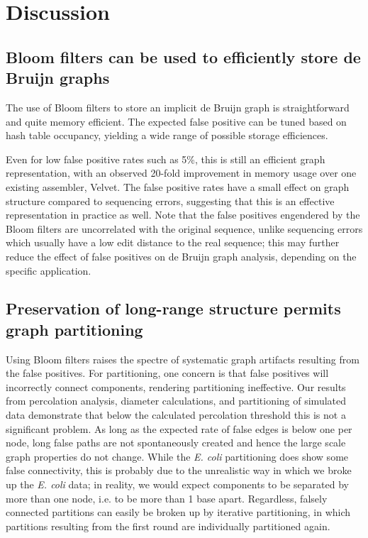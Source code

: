 \documentclass[12pt]{article} \usepackage{simplemargins}
\begin{document}
\section{Discussion}

\subsection{Bloom filters can be used to efficiently store de Bruijn graphs}


The use of Bloom filters to store an implicit de Bruijn graph is
straightforward and quite memory efficient.  The expected false
positive can be tuned based on hash table occupancy, yielding a wide
range of possible storage efficiences.

Even for low false positive rates such as 5\%, this is still an 
efficient graph representation, with an observed 20-fold improvement
in memory usage over one existing assembler, Velvet.  The false
positive rates have a small effect on graph structure compared to
sequencing errors, suggesting that this is an effective representation
in practice as well.  Note that the false positives engendered by the
Bloom filters are uncorrelated with the original sequence, unlike
sequencing errors which usually have a low edit distance to the
real sequence; this may further reduce the effect of false positives
on de Bruijn graph analysis, depending on the specific application.

\subsection{Preservation of long-range structure permits graph partitioning}

Using Bloom filters raises the spectre of systematic graph artifacts
resulting from the false positives.  For partitioning, one concern is
that false positives will incorrectly connect components, rendering
partitioning ineffective.  Our results from percolation analysis,
diameter calculations, and partitioning of simulated data demonstrate
that below the calculated percolation threshold this is not a
significant problem.  As long as the expected rate of false edges is
below one per node, long false paths are not spontaneously created and
hence the large scale graph properties do not change.  While the \emph{E. coli} partitioning
does show some false connectivity, this is probably due to the
unrealistic way in which we broke up the \emph{E. coli} data; in reality, we
would expect components to be separated by more than one
node, i.e. to be more than 1 base apart.  Regardless, falsely connected partitions can easily be broken
up by iterative partitioning, in which partitions resulting from the
first round are individually partitioned again.
\end{document}
